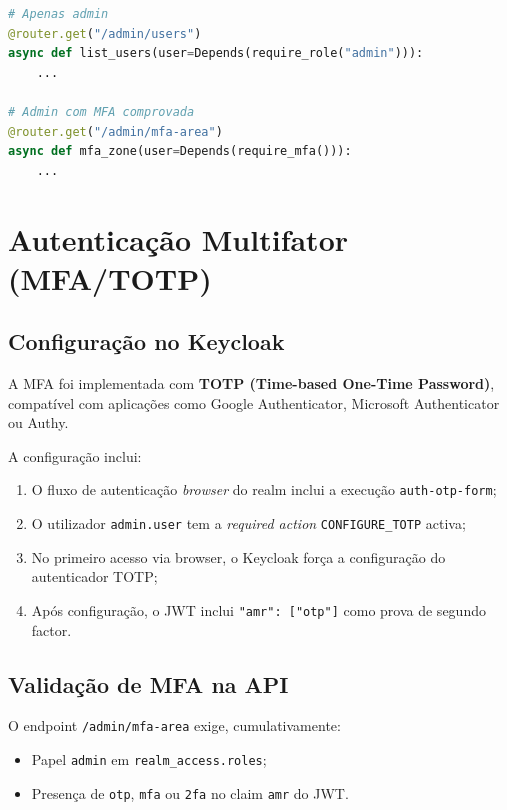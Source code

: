 \documentclass[12pt,a4paper]{article}
\begin{document}
\begin{lstlisting}[language=python, caption=Aplicação das dependências nos endpoints]
# Apenas admin
@router.get("/admin/users")
async def list_users(user=Depends(require_role("admin"))):
    ...

# Admin com MFA comprovada
@router.get("/admin/mfa-area")
async def mfa_zone(user=Depends(require_mfa())):
    ...
\end{lstlisting}

\section{Autenticação Multifator (MFA/TOTP)}

\subsection{Configuração no Keycloak}

A MFA foi implementada com \textbf{TOTP (Time-based One-Time Password)}, compatível com aplicações como Google Authenticator, Microsoft Authenticator ou Authy.

A configuração inclui:

\begin{enumerate}[leftmargin=1.5cm]
  \item O fluxo de autenticação \textit{browser} do realm inclui a execução \texttt{auth-otp-form};
  \item O utilizador \texttt{admin.user} tem a \textit{required action} \texttt{CONFIGURE\_TOTP} activa;
  \item No primeiro acesso via browser, o Keycloak força a configuração do autenticador TOTP;
  \item Após configuração, o JWT inclui \texttt{"amr": ["otp"]} como prova de segundo factor.
\end{enumerate}

\subsection{Validação de MFA na API}

O endpoint \texttt{/admin/mfa-area} exige, cumulativamente:
\begin{itemize}[leftmargin=1.5cm]
  \item Papel \texttt{admin} em \texttt{realm\_access.roles};
  \item Presença de \texttt{otp}, \texttt{mfa} ou \texttt{2fa} no claim \texttt{amr} do JWT.
\end{itemize}
\end{document}

